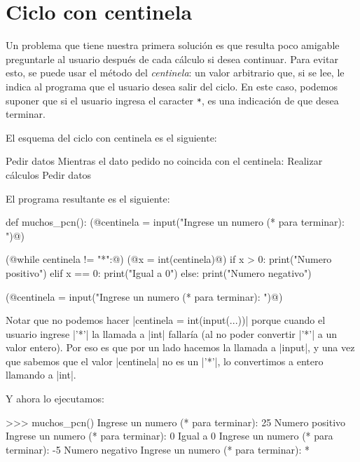 \section{Ciclo con centinela}
\label{centinela}

Un problema que tiene nuestra primera solución es que resulta poco amigable
preguntarle al usuario después de cada cálculo si desea continuar. Para evitar
esto, se puede usar el método del \emph{centinela}: un valor arbitrario que, si
se lee, le indica al programa que el usuario desea salir del ciclo. En este
caso, podemos suponer que si el usuario ingresa el caracter \lstinline!*!, es
una indicación de que desea terminar.

El esquema del ciclo con centinela es el siguiente:

\begin{codigo-nohl-sn}
Pedir datos
Mientras el dato pedido no coincida con el centinela:
    Realizar cálculos
    Pedir datos
\end{codigo-nohl-sn}

El programa resultante es el siguiente:

\begin{codigo-python-sn}
def muchos_pcn():
    (@centinela = input("Ingrese un numero (* para terminar): ")@)

    (@while centinela != "*":@)
        (@x = int(centinela)@)
        if x > 0:
            print("Numero positivo")
        elif x == 0:
            print("Igual a 0")
        else:
            print("Numero negativo")

        (@centinela = input("Ingrese un numero (* para terminar): ")@)
\end{codigo-python-sn}

Notar que no podemos hacer |centinela = int(input(...))| porque cuando el
usuario ingrese |'*'| la llamada a |int| fallaría (al no poder convertir |'*'|
a un valor entero). Por eso es que por un lado hacemos la llamada a |input|, y
una vez que sabemos que el valor |centinela| no es un |'*'|, lo convertimos a
entero llamando a |int|.

Y ahora lo ejecutamos:

\begin{codigo-python-sn}
>>> muchos_pcn()
Ingrese un numero (* para terminar): 25
Numero positivo
Ingrese un numero (* para terminar): 0
Igual a 0
Ingrese un numero (* para terminar): -5
Numero negativo
Ingrese un numero (* para terminar): *
\end{codigo-python-sn}

